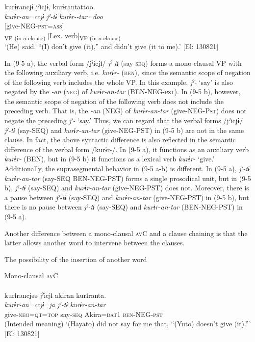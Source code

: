  \gllll  kurɨrancjɨ  jˀicjɨ,  kurɨrantattoo.\\
    \textit{kurɨr-an=ccjɨ}  \textit{jˀ-tɨ}  \textit{kurɨr--tar=doo}\\
    [give-\textsc{neg}=\textsc{qt}  say-\textsc{seq}]  [give-NEG-\textsc{pst}=\textsc{ass}]\\
    [Complement  Lex. verb]\textsubscript{VP (in a clause)}  [Lex. verb]\textsubscript{VP (in a clause)}\\
    \glt     ‘(He) said, “(I) don’t give (it),” and didn’t give (it to me).’ [El: 130821]
\z
\z

In (9-5 a), the verbal form /jˀicjɨ/ \textit{jˀ-tɨ} (say-\textsc{seq}) forms a mono-clausal VP with the following auxiliary verb, i.e. \textit{kurɨr-} (\textsc{ben}), since the semantic scope of negation of the following verb includes the whole VP. In this example, \textit{jˀ-} ‘say’ is also negated by the \textit{{}-an} (\textsc{neg}) of \textit{kurɨr-an-tar} (BEN-NEG-\textsc{pst}). In (9-5 b), however, the semantic scope of negation of the following verb does not include the preceding verb. That is, the \textit{{}-an} (NEG) of \textit{kurɨr-an-tar} (give-NEG-P\textsc{st}) does not negate the preceding \textit{jˀ-} ‘say.’ Thus, we can regard that the verbal forms /jˀicjɨ/ \textit{jˀ-tɨ} (say-SEQ) and \textit{kurɨr-an-tar} (give-NEG-PST) in (9-5 b) are not in the same clause. In fact, the above syntactic difference is also reflected in the semantic difference of the verbal form /kurɨr-/. In (9-5 a), it functions as an auxiliary verb \textit{kurɨr-} (BEN), but in (9-5 b) it functions as a lexical verb \textit{kurɨr-} ‘give.’ Additionally, the suprasegmental behavior in (9-5 a-b) is different. In (9-5 a), \textit{jˀ-tɨ} \textit{kurɨr-an-tar} (say-SEQ BEN-NEG-PST) forms a single prosodical unit, but in (9-5 b), \textit{jˀ-tɨ} (say-SEQ) and \textit{kurɨr-an-tar} (give-NEG-PST) does not. Moreover, there is a pause between \textit{jˀ-tɨ} (say-SEQ) and \textit{kurɨr-an-tar} (give-NEG-PST) in (9-5 b), but there is no pause between \textit{jˀ-tɨ} (say-SEQ) and \textit{kurɨr-an-tar} (BEN-NEG-PST) in (9-5 a).

Another difference between a mono-clausal \textsc{av}C and a clause chaining is that the latter allows another word to intervene between the clauses.

\ea   The possibility of the insertion of another word \label{ex:9.6}

  \ea \label{ex:9.6a}Mono-clausal \textsc{av}C\\\\
 \glll  *kurɨrancjəə  jˀicjɨ  akiran  kurɨranta.\\
    \textit{kurɨr-an=ccjɨ=ja}  \textit{jˀ-tɨ}  \textit{}  \textit{kurɨr-an-tar}\\
    give-\textsc{neg}=\textsc{qt}=\textsc{top}  say-\textsc{seq}  Akira=\textsc{dat}1  \textsc{ben}-NEG-\textsc{pst}\\
    \glt     (Intended meaning) ‘(Hayato) did not say  for me that, “(Yuto) doesn’t give (it).”’ [El: 130821]

